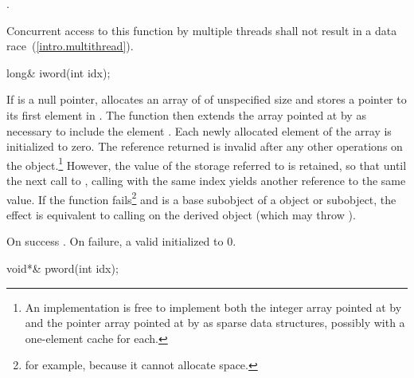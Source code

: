 \begin{itemdescr}
\pnum
\returns
{}
\tcode{++}.

\pnum
\remarks
Concurrent access to this function by multiple threads shall not result in a data
race~(\ref{intro.multithread}).
\end{itemdescr}

%
\begin{itemdecl}
long& iword(int idx);
\end{itemdecl}

\begin{itemdescr}
\pnum
\effects
If  is a null pointer, allocates an array of
of unspecified size and stores a pointer to its first element in
.
The function then extends the array pointed at by
 as necessary to include the element
.
Each newly allocated element of the array is initialized to zero.
The reference returned is invalid after any other operations on the
object.\footnote{An implementation is free to implement both the integer
array pointed at by  and the pointer array pointed at by
 as sparse data structures, possibly with a one-element
cache for each.}
However, the value of the storage referred to is retained, so
that until the next call to
,
calling
with the same index yields another reference to the same value.
If the function fails\footnote{for example, because it cannot allocate space.}
and
is a base subobject of a
object or subobject, the effect is equivalent to calling
on the derived object (which may throw
).

\pnum
\returns
On success
.
On failure, a valid
initialized to 0.
\end{itemdescr}

%
\begin{itemdecl}
void*& pword(int idx);
\end{itemdecl}

